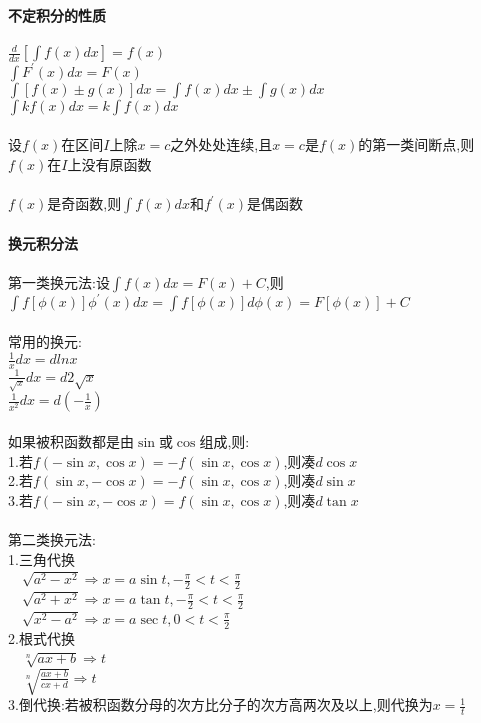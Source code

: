 \documentclass{article}
\begin{document}
\begin{flushleft}
	~\\ \textbf{不定积分的性质} \\~\\
	
	$\frac{d}{dx}[\int f(x)dx]=f(x)$\\
	$\int F^{'}(x)dx=F(x)$\\
	$\int [f(x)\pm g(x)]dx=\int f(x)dx \pm \int g(x)dx$\\
	$\int kf(x)dx=k\int f(x)dx$\\
	~\\
	设$f(x)$在区间$I$上除$x=c$之外处处连续,且$x=c$是$f(x)$的第一类间断点,则$f(x)$在$I$上没有原函数\\
	~\\
	$f(x)$是奇函数,则$\int f(x)dx$和$f^{'}(x)$是偶函数\\
	
	~\\ \textbf{换元积分法} \\~\\
	
	第一类换元法:设$\int f(x)dx=F(x)+C$,则$\int f[\phi(x)]\phi^{'}(x)dx=\int f[\phi(x)]d\phi(x)=F[\phi(x)]+C$\\
	~\\
	常用的换元:\\
	$\frac{1}{x}dx=dlnx$\\
	$\frac{1}{\sqrt{x}}dx=d2\sqrt{x}$\\
	$\frac{1}{x^2}dx=d(-\frac{1}{x})$\\
	~\\
	如果被积函数都是由$\sin$或$\cos$组成,则:\\
	1.若$f(-\sin x,\cos x)=-f(\sin x,\cos x)$,则凑$d\cos x$\\
	2.若$f(\sin x,-\cos x)=-f(\sin x,\cos x)$,则凑$d\sin x$\\
	3.若$f(-\sin x,-\cos x)=f(\sin x,\cos x)$,则凑$d\tan x$\\
	~\\
	第二类换元法:\\
	1.三角代换\\
	\ \ $\sqrt{a^2-x^2} \Rightarrow x=a\sin t, -\frac{\pi}{2}<t<\frac{\pi}{2}$\\
	\ \ $\sqrt{a^2+x^2} \Rightarrow x=a\tan t, -\frac{\pi}{2}<t<\frac{\pi}{2}$\\
	\ \ $\sqrt{x^2-a^2} \Rightarrow x=a\sec t, 0<t<\frac{\pi}{2}$\\
	2.根式代换\\
	\ \ $\sqrt[n]{ax+b} \Rightarrow t$\\
	\ \ $\sqrt[n]{\frac{ax+b}{cx+d}} \Rightarrow t$\\
	3.倒代换:若被积函数分母的次方比分子的次方高两次及以上,则代换为$x=\frac{1}{t}$\\
	

\end{flushleft}
\end{document}
